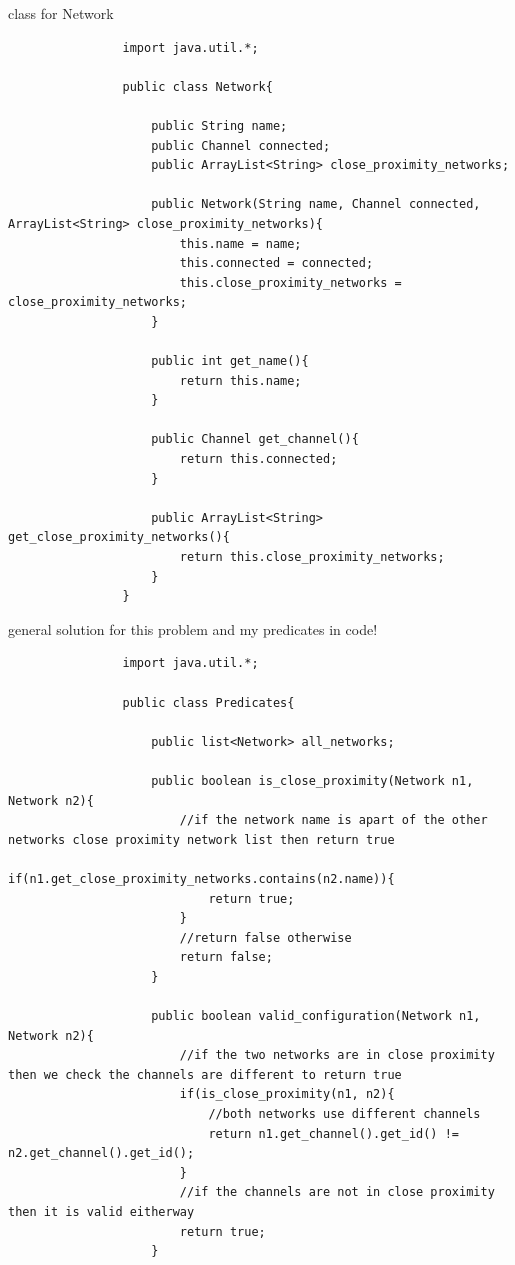 \documentclass{article}
\begin{document}
\begin{enumerate}[(a)]
\begin{enumerate}[(i)]
            class for Network
            \begin{lstlisting}
                import java.util.*;
                
                public class Network{
                
                    public String name;
                    public Channel connected;
                    public ArrayList<String> close_proximity_networks;
                    
                    public Network(String name, Channel connected, ArrayList<String> close_proximity_networks){
                        this.name = name;
                        this.connected = connected;
                        this.close_proximity_networks = close_proximity_networks;
                    }
                    
                    public int get_name(){
                        return this.name;
                    }
                    
                    public Channel get_channel(){
                        return this.connected;
                    }
                    
                    public ArrayList<String> get_close_proximity_networks(){
                        return this.close_proximity_networks;
                    }
                }
            \end{lstlisting}
            
            \newpage
            general solution for this problem and my predicates in code!
            \begin{lstlisting}
                import java.util.*;
                
                public class Predicates{
        
                    public list<Network> all_networks;
        
                    public boolean is_close_proximity(Network n1, Network n2){
                        //if the network name is apart of the other networks close proximity network list then return true
                        if(n1.get_close_proximity_networks.contains(n2.name)){
                            return true;
                        }
                        //return false otherwise
                        return false;
                    }
                    
                    public boolean valid_configuration(Network n1, Network n2){
                        //if the two networks are in close proximity then we check the channels are different to return true
                        if(is_close_proximity(n1, n2){
                            //both networks use different channels
                            return n1.get_channel().get_id() != n2.get_channel().get_id();
                        }
                        //if the channels are not in close proximity then it is valid eitherway
                        return true;
                    }
                    

\end{lstlisting}
\end{enumerate}
\end{enumerate}
\end{document}
